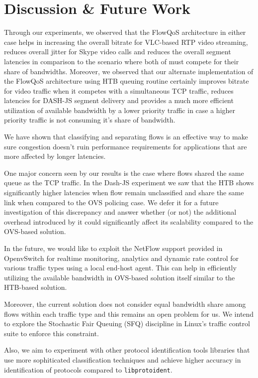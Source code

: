 \section{Discussion \& Future Work}
\label{sec:discussion}
Through our experiments, we observed that the FlowQoS architecture in either case helps in increasing the overall bitrate for VLC-based RTP video streaming, reduces overall jitter for Skype video calls and reduces the overall segment latencies in comparison to the scenario where both of must compete for their share of bandwidths.
Moreover, we observed that our alternate implementation of the FlowQoS architecture using HTB queuing routine certainly improves bitrate for video traffic when it competes with a simultaneous TCP traffic, reduces latencies for DASH-JS segment delivery and provides a much more efficient utilization of available bandwidth by a lower priority traffic in case a higher priority traffic is not consuming it's share of bandwidth.

We have shown that classifying and separating flows is an effective way to make sure congestion doesn't ruin performance requirements for applications that are more affected by longer latencies.

One major concern seen by our results is the case where flows shared the same queue as the TCP traffic. In the Dash-JS experiment we saw that the HTB shows significantly higher latencies when flow remain unclassified and share the same link when compared to the OVS policing case. We defer it for a future investigation of this discrepancy and answer whether (or not) the additional overhead introduced by it could significantly affect its scalability compared to the OVS-based solution.

In the future, we would like to exploit the NetFlow support provided in OpenvSwitch for realtime monitoring, analytics and dynamic rate control for various traffic types using a local end-host agent. This can help in efficiently utilizing the available bandwidth in OVS-based solution itself similar to the HTB-based solution.

Moreover, the current solution does not consider equal bandwidth share among flows within each traffic type and this remains an open problem for us. We intend to explore the Stochastic Fair Queuing (SFQ) discipline in Linux's traffic control suite to enforce this constraint.

Also, we aim to experiment with other protocol identification tools libraries that use more sophiticated classification techniques and achieve higher accuracy in identification of protocols compared to \texttt{libprotoident}.

